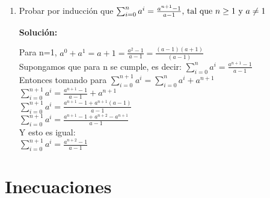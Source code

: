 \documentclass{article}
\begin{document}
\begin{enumerate}
  
  \item Probar por inducción que
  \(\sum_{i=0}^{n}a^i=\frac{a^{n+1}-1}{a-1}$, tal que $n \geq 1$ y $a \neq 1\)
  
   \textbf{Solución:}
  
  Para n=1, \(a ^0 + a^1 = a + 1=\frac{a^2 -1}{a-1} = \frac{(a -1)(a+1)}{(a-1)}\) \\
  Supongamos que para n se cumple, es decir:  \(\sum_{i=0}^{n}a^i=\frac{a^{n+1}-1}{a-1}\) \\
  Entonces tomando para \(\sum_{i=0}^{n+1}a^i=\sum_{i=0}^{n}a^i + a^{n+1} \)\\
  \(\sum_{i=0}^{n+1}a^i=\frac{a^{n+1}-1}{a-1} + a^{n+1} \)\\
  \(\sum_{i=0}^{n+1}a^i=\frac{a^{n+1}-1 + a^{n+1}(a-1)}{a-1} \)\\
  \(\sum_{i=0}^{n+1}a^i=\frac{a^{n+1}-1 + a^{n+2} - a^{n+1}}{a-1} \)\\
  Y esto es igual:\\
  \(\sum_{i=0}^{n+1}a^i=\frac{a^{n+2}-1}{a-1} \)\\
    
\end{enumerate}

\section{Inecuaciones}
\end{document}
